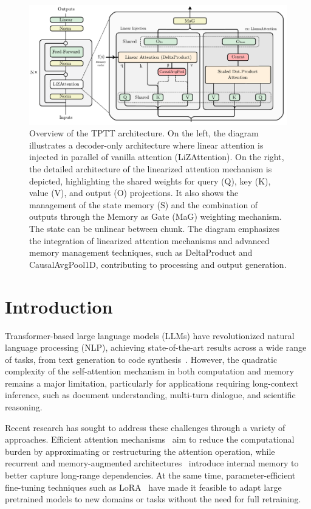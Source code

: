 \documentclass[10pt,a4paper]{article}
\begin{document}
\begin{figure}[ht]
    \centering
    \includegraphics[width=0.8\linewidth]{fig.pdf}
    \caption{Overview of the TPTT architecture. On the left, the diagram illustrates a decoder-only architecture where linear attention is injected in parallel of vanilla attention (LiZAttention). On the right, the detailed architecture of the linearized attention mechanism is depicted, highlighting the shared weights for query (Q), key (K), value (V), and output (O) projections. It also shows the management of the state memory (S) and the combination of outputs through the Memory as Gate (MaG) weighting mechanism. The state can be unlinear between chunk. The diagram emphasizes the integration of linearized attention mechanisms and advanced memory management techniques, such as DeltaProduct and CausalAvgPool1D, contributing to processing and output generation.}
    \label{fig:approach_overview}
\end{figure}


\section{Introduction}

Transformer-based large language models (LLMs) have revolutionized natural language processing (NLP), achieving state-of-the-art results across a wide range of tasks, from text generation to code synthesis~\cite{vaswani2017attention, mann2020language}. However, the quadratic complexity of the self-attention mechanism in both computation and memory remains a major limitation, particularly for applications requiring long-context inference, such as document understanding, multi-turn dialogue, and scientific reasoning.

Recent research has sought to address these challenges through a variety of approaches. Efficient attention mechanisms~\cite{katharopoulos2020transformers, yang2024parallelizing} aim to reduce the computational burden by approximating or restructuring the attention operation, while recurrent and memory-augmented architectures~\cite{mercat2024linearizing, behrouz2024titans} introduce internal memory to better capture long-range dependencies. At the same time, parameter-efficient fine-tuning techniques such as LoRA~\cite{hu2022lora} have made it feasible to adapt large pretrained models to new domains or tasks without the need for full retraining.
\end{document}

